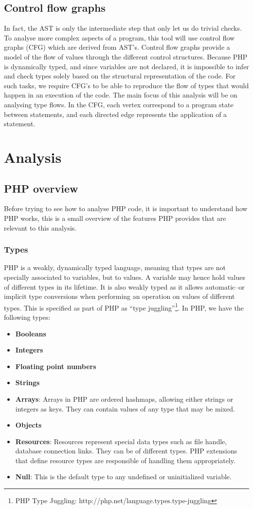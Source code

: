 \documentclass[a4paper]{article}
\begin{document}
\subsection{Control flow graphs}
In fact, the AST is only the intermediate step that only let us do trivial
checks. To analyse more complex aspects of a program, this tool will use
control flow graphs (CFG) which are derived from AST's.  Control flow graphs
provide a model of the flow of values through the different control structures.
Because PHP is dynamically typed, and since variables are not declared, it is
impossible to infer and check types solely based on the structural
representation of the code. For such tasks, we require CFG's to be able to
reproduce the flow of types that would happen in an execution of the code. The
main focus of this analysis will be on analysing type flows. In the CFG, each
vertex correspond to a program state between statements, and each directed edge
represents the application of a statement.

\section{Analysis}
\subsection{PHP overview}
Before trying to see how to analyse PHP code, it is important to understand how
PHP works, this is a small overview of the features PHP provides that are
relevant to this analysis.
\subsubsection{Types}
PHP is a weakly, dynamically typed language, meaning that types are not
specially associated to variables, but to values. A variable may hence hold
values of different types in its lifetime. It is also weakly typed as it allows
automatic--or implicit type conversions when performing an operation on values
of different types.  This is specified as part of PHP as ``type
juggling''\footnote{PHP Type Juggling:
http://php.net/language.types.type-juggling}. In PHP, we have the following
types:
\begin{itemize}
  \item \textbf{Booleans}
  \item \textbf{Integers}
  \item \textbf{Floating point numbers}
  \item \textbf{Strings}
  \item \textbf{Arrays}: Arrays in PHP are ordered hashmaps, allowing either
    strings or integers as keys.  They can contain values of any type that may
    be mixed.
  \item \textbf{Objects}
  \item \textbf{Resources}: Resources represent special data types such as file
    handle, database connection links. They can be of different types. PHP
    extensions that define resource types are responsible of handling them
    appropriately.
  \item \textbf{Null}: This is the default type to any undefined or
    uninitialized variable.
\end{itemize}
\end{document}
